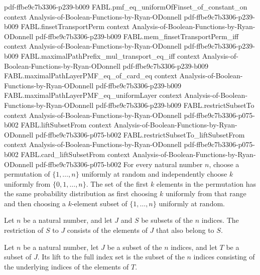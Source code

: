 \begin{theorem}
  {pdf-ffbe9c7b3306-p239-b009}
\proofstep
  {FABL.pmf_eq_uniformOfFinset_of_constant_on}
  {context}
  {Analysis-of-Boolean-Functions-by-Ryan-ODonnell}
  {pdf-ffbe9c7b3306-p239-b009}
\proofstep
  {FABL.finsetTransportPerm}
  {context}
  {Analysis-of-Boolean-Functions-by-Ryan-ODonnell}
  {pdf-ffbe9c7b3306-p239-b009}
\proofstep
  {FABL.mem_finsetTransportPerm_iff}
  {context}
  {Analysis-of-Boolean-Functions-by-Ryan-ODonnell}
  {pdf-ffbe9c7b3306-p239-b009}
\proofstep
  {FABL.maximalPathPrefix_mul_transport_eq_iff}
  {context}
  {Analysis-of-Boolean-Functions-by-Ryan-ODonnell}
  {pdf-ffbe9c7b3306-p239-b009}
\proofstep
  {FABL.maximalPathLayerPMF_eq_of_card_eq}
  {context}
  {Analysis-of-Boolean-Functions-by-Ryan-ODonnell}
  {pdf-ffbe9c7b3306-p239-b009}
\proofstep
  {FABL.maximalPathLayerPMF_eq_uniformLayer}
  {context}
  {Analysis-of-Boolean-Functions-by-Ryan-ODonnell}
  {pdf-ffbe9c7b3306-p239-b009}
\proofstep
  {FABL.restrictSubsetTo}
  {context}
  {Analysis-of-Boolean-Functions-by-Ryan-ODonnell}
  {pdf-ffbe9c7b3306-p075-b002}
\proofstep
  {FABL.liftSubsetFrom}
  {context}
  {Analysis-of-Boolean-Functions-by-Ryan-ODonnell}
  {pdf-ffbe9c7b3306-p075-b002}
\proofstep
  {FABL.restrictSubsetTo_liftSubsetFrom}
  {context}
  {Analysis-of-Boolean-Functions-by-Ryan-ODonnell}
  {pdf-ffbe9c7b3306-p075-b002}
\proofstep
  {FABL.card_liftSubsetFrom}
  {context}
  {Analysis-of-Boolean-Functions-by-Ryan-ODonnell}
  {pdf-ffbe9c7b3306-p075-b002}
For every natural number $n$, choose a permutation of $\{1,\ldots,n\}$ uniformly at
random and independently choose $k$ uniformly from $\{0,1,\ldots,n\}$. The set of the
first $k$ elements in the permutation has the same probability distribution as first
choosing $k$ uniformly from that range and then choosing a $k$-element subset of
$\{1,\ldots,n\}$ uniformly at random.
\end{theorem}

\begin{definition}
\label{FABL.restrictSubsetTo}
\leanok
Let $n$ be a natural number, and let $J$ and $S$ be subsets of the $n$ indices. The
restriction of $S$ to $J$ consists of the elements of $J$ that also belong to $S$.
\end{definition}

\begin{definition}
\label{FABL.liftSubsetFrom}
\leanok
Let $n$ be a natural number, let $J$ be a subset of the $n$ indices, and let $T$ be a
subset of $J$. Its lift to the full index set is the subset of the $n$ indices
consisting of the underlying indices of the elements of $T$.
\end{definition}

